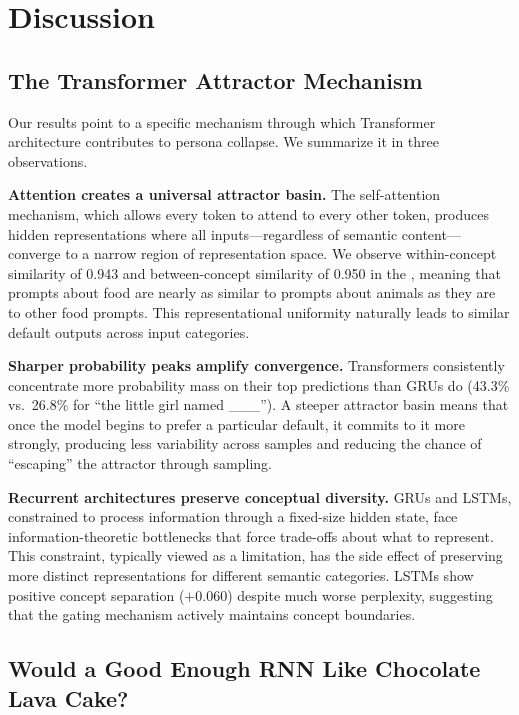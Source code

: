 \section{Discussion}
\label{sec:discussion}

\subsection{The Transformer Attractor Mechanism}

Our results point to a specific mechanism through which Transformer architecture contributes to persona collapse. We summarize it in three observations.

{\bf Attention creates a universal attractor basin.} The self-attention mechanism, which allows every token to attend to every other token, produces hidden representations where all inputs---regardless of semantic content---converge to a narrow region of representation space. We observe within-concept similarity of 0.943 and between-concept similarity of 0.950 in the \transformer, meaning that prompts about food are nearly as similar to prompts about animals as they are to other food prompts. This representational uniformity naturally leads to similar default outputs across input categories.

{\bf Sharper probability peaks amplify convergence.} Transformers consistently concentrate more probability mass on their top predictions than GRUs do (43.3\% vs.\ 26.8\% for ``the little girl named \_\_\_''). A steeper attractor basin means that once the model begins to prefer a particular default, it commits to it more strongly, producing less variability across samples and reducing the chance of ``escaping'' the attractor through sampling.

{\bf Recurrent architectures preserve conceptual diversity.} GRUs and LSTMs, constrained to process information through a fixed-size hidden state, face information-theoretic bottlenecks that force trade-offs about what to represent. This constraint, typically viewed as a limitation, has the side effect of preserving more distinct representations for different semantic categories. LSTMs show positive concept separation ($+0.060$) despite much worse perplexity, suggesting that the gating mechanism actively maintains concept boundaries.

\subsection{Would a Good Enough RNN Like Chocolate Lava Cake?}

